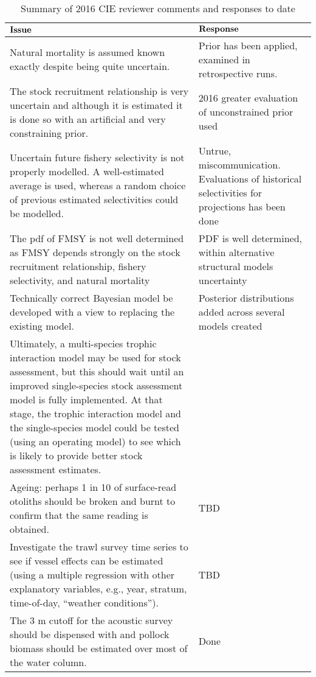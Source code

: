 \documentclass[]{article}
\begin{document}
\begin{table}[ht]
\centering
\caption{ Summary of 2016 CIE reviewer comments and responses to date }
\footnotesize
\label{tab:CIE_review}
\begin{tabular}{p{4.0in}p{2.5in}}
\hline
$\normalsize \textbf{Issue}$   &  $\normalsize \textbf{Response}$ \\
\hline
Natural mortality is assumed known exactly despite being quite uncertain.   &   Prior has been applied, examined in retrospective runs. \\
The stock recruitment relationship is very uncertain and although it is estimated it is done so with an artificial and very constraining prior. &   2016 greater evaluation of unconstrained prior used \\
Uncertain future fishery selectivity is not properly modelled. A well-estimated average is used, whereas a random choice of previous estimated selectivities could be modelled. &   Untrue, miscommunication. Evaluations of historical selectivities for projections has been done \\
The pdf of FMSY is not well determined as FMSY depends strongly on the stock recruitment relationship, fishery selectivity, and natural mortality   &   PDF is well determined, within alternative structural models uncertainty \\
Technically correct Bayesian model be developed with a view to replacing the existing model.    &   Posterior distributions added across several models created \\
Ultimately, a multi-species trophic interaction model may be used for stock assessment, but this should wait until an improved single-species stock assessment model is fully implemented. At that stage, the trophic interaction model and the single-species model could be tested (using an operating model) to see which is likely to provide better stock assessment estimates.    &    \\
Ageing: perhaps 1 in 10 of surface-read otoliths should be broken and burnt to confirm that the same reading is obtained.   &   TBD \\
Investigate the trawl survey time series to see if vessel effects can be estimated (using a multiple regression with other explanatory variables, e.g., year, stratum, time-of-day, “weather conditions”).  &   TBD \\
The 3 m cutoff for the acoustic survey should be dispensed with and pollock biomass should be estimated over most of the water column.  &   Done \\

\end{tabular}
\end{table}
\end{document}
